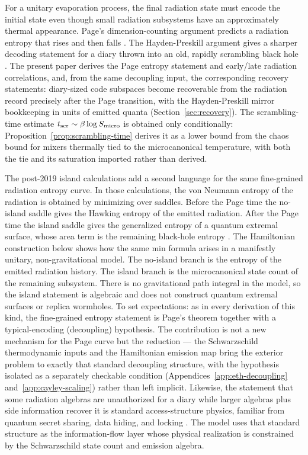 \documentclass[12pt]{article}
\newcommand{\Smicro}{S_{\rm micro}}
\begin{document}
For a unitary evaporation process, the final radiation state must encode the
initial state even though small radiation subsystems have an approximately
thermal appearance.  Page's dimension-counting argument predicts a radiation
entropy that rises and then falls \cite{Page1993Average,
Page1993Info}.  The Hayden-Preskill argument gives a sharper decoding
statement for a diary thrown into an old, rapidly scrambling black hole
\cite{HaydenPreskill2007,SekinoSusskind2008}.  The present paper derives the
Page entropy statement and early/late radiation correlations, and, from the
same decoupling input, the corresponding recovery statements: diary-sized
code subspaces become recoverable from the radiation record precisely after
the Page transition, with the Hayden-Preskill mirror bookkeeping in units of
emitted quanta (Section~\ref{sec:recovery}).  The scrambling-time estimate
$t_{\rm scr}\sim\beta\log\Smicro$ is obtained only conditionally:
Proposition~\ref{prop:scrambling-time} derives it as a lower bound from the
chaos bound for mixers thermally tied to the microcanonical temperature,
with both the tie and its saturation imported rather than derived.

The post-2019 island calculations add a second language for the same
fine-grained radiation entropy curve.  In those calculations, the von Neumann
entropy of the radiation is obtained by minimizing over saddles.  Before the
Page time the no-island saddle gives the Hawking entropy of the emitted
radiation.  After the Page time the island saddle gives the generalized
entropy of a quantum extremal surface, whose area term is the remaining
black-hole entropy \cite{Penington2019,
AlmheiriEngelhardtMarolfMaxfield2019,
AlmheiriHartmanMaldacenaShaghoulianTajdini2020,
AlmheiriHartmanMaldacenaShaghoulianTajdini2021}.  The Hamiltonian construction
below shows how the same min formula arises in a manifestly unitary,
non-gravitational model.  The no-island branch is the entropy of the emitted
radiation history.  The island branch is the microcanonical state count of the
remaining subsystem.  There is no gravitational path integral in the model, so
the island statement is algebraic and does not construct quantum extremal
surfaces or replica wormholes.
To set expectations: as in every derivation of this kind, the fine-grained
entropy statement is Page's theorem together with a typical-encoding
(decoupling) hypothesis.  The contribution is not a new mechanism for the
Page curve but the reduction --- the Schwarzschild thermodynamic inputs and
the Hamiltonian emission map bring the exterior problem to exactly that
standard decoupling structure, with the hypothesis isolated as a separately
checkable condition (Appendices~\ref{app:eth-decoupling}
and~\ref{app:cayley-scaling}) rather than left implicit.  Likewise, the
statement that some radiation algebras are unauthorized for a diary while
larger algebras plus side information recover it is standard
access-structure physics, familiar from quantum secret sharing, data hiding,
and locking \cite{CleveGottesmanLo1999,TerhalDiVincenzoLeung2001,
DiVincenzoHaydenTerhal2004}.  The model uses that standard structure as the
information-flow layer whose physical realization is constrained by the
Schwarzschild state count and emission algebra.
\end{document}
